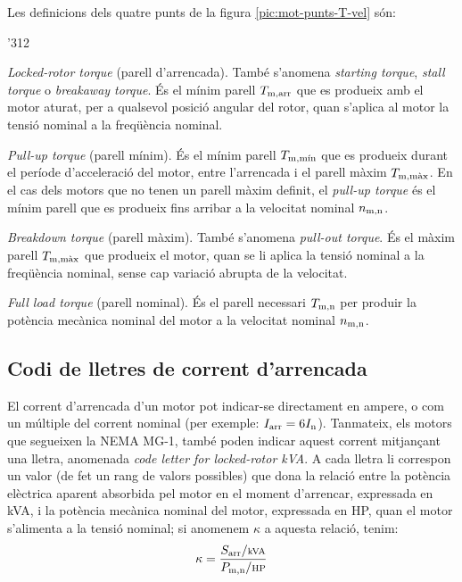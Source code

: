 Les definicions dels quatre punts de la figura  \vref{pic:mot-punts-T-vel} són:
\begin{dingautolist}{'312}
   \item \textit{Locked-rotor torque} (parell d'arrencada). També s'anomena \textit{starting torque}, \textit{stall torque} o \textit{breakaway torque}. És el mínim parell $T_\mathrm{m,arr}$ que es produeix amb el motor aturat, per a qualsevol posició angular del rotor, quan s'aplica al motor la tensió nominal a la freqüència nominal.
   \item \textit{Pull-up torque} (parell mínim). És el mínim parell $T_\mathrm{m,\text{mín}}$ que es produeix durant el període d'acceleració del motor, entre l'arrencada  i el parell màxim $T_\mathrm{m,\text{màx}}$. En el cas dels motors que no tenen un parell màxim definit, el \textit{pull-up torque} és el mínim parell que es produeix fins arribar a la velocitat nominal $n_\mathrm{m,n}$.
   \item \textit{Breakdown torque} (parell màxim). També s'anomena \textit{pull-out torque}. És el màxim parell $T_\mathrm{m,\text{màx}}$ que  produeix  el motor, quan se li aplica  la tensió nominal a la freqüència nominal, sense cap variació abrupta de la velocitat.
   \item \textit{Full load torque} (parell nominal). És el parell necessari $T_\mathrm{m,n}$ per produir la potència mecànica nominal del motor a la velocitat nominal  $n_\mathrm{m,n}$.
\end{dingautolist}

\subsection{Codi de lletres de corrent d'arrencada}

El corrent d'arrencada d'un motor pot indicar-se directament en ampere, o com un múltiple del corrent nominal (per exemple: $I_\mathrm{arr} = 6 I_\mathrm{n}$). Tanmateix, els motors que segueixen la NEMA MG-1, també poden indicar aquest corrent mitjançant una lletra, anomenada \textit{code letter for locked-rotor kVA}. A cada lletra li correspon un valor (de fet un rang de valors possibles) que dona la relació entre la potència elèctrica aparent absorbida pel motor en el moment d'arrencar, expressada en kVA, i la potència mecànica nominal del motor, expressada en HP, quan el motor s'alimenta a la tensió nominal; si anomenem $\kappa$ a aquesta relació, tenim:
\begin{equation}
    \kappa = \frac{S\ped{arr}/{\scriptstyle\unit{kVA}}}{P\ped{m,n}/{\scriptstyle \unit{HP}}}
\end{equation}

